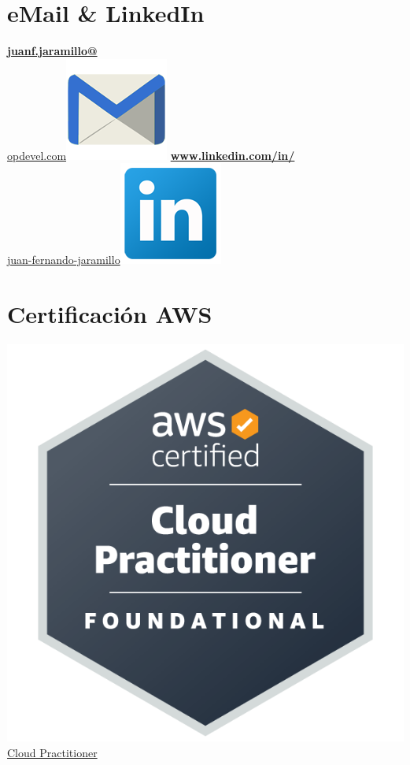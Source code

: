 \begin{aside}
    \section{eMail \& LinkedIn}
    \href{mailto:juanf.jaramillo@opdevel.com}{\small{\textbf{juanf.jaramillo@}\\opdevel.com}\includegraphics[scale=0.07]{img/email2.png}}
    \href{https://www.linkedin.com/in/juan-fernando-jaramillo/}{\textbf{www.linkedin.com/in/}\small{\\juan-fernando-jaramillo}\includegraphics[scale=0.07]{img/Linkedin.png}}
   ~
   ~
    \section{Certificación AWS}
    \href{https://www.credly.com/badges/2a62b468-b67f-47cc-b7a6-8a8da5de9c4d/public_url}{\includegraphics[scale=0.02]{img/aws-certified-cloud-practitioner.png}Cloud Practitioner}
   ~
   ~
   ~
   ~
   ~
   ~

\end{aside}
